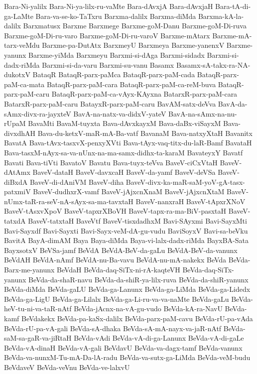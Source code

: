 {Bara-Ni-yalilx
Bara-Ni-ya-lilx-ru-vaMte
Bara-dAvxjA
Bara-dAvxjaH
Bara-tA-di-ga-LaMte
Bara-va-se-ko-TaTxru
Barxma-dalilx
Barxma-diMda
Barxma-kA-la-dalilx
Barxmatusx
Barxme
Barxmege
Barxme-goM-Danu
Barxme-goM-Di-ruva
Barxme-goM-Di-ru-varo
Barxme-goM-Di-ru-varoV
Barxme-mAtarx
Barxme-mA-tarx-veMdu
Barxme-pa-DutAtx
BarxmeyU
Barxmeya
Barxme-yanenxV
Barxme-yanunx
Barxme-yiMda
Barxmeyu
Barxmi-si-dAga
Barxmi-sidadx
Barxmi-si-dadx-riMda
Barxmi-si-da-varu
Barxmi-su-vanu
Basamx
Basamx-sA-takx-ra-NA-dukotxV
BataqR
BataqR-parx-paMca
BataqR-parx-paM-cada
BataqR-parx-paM-ca-mata
BataqR-parx-paM-cara
BataqR-parx-paM-ca-reM-buva
BataqR-parx-paM-caru
BataqR-parx-paM-ca-vAyx-KAyxna
BatarxR-parx-paM-cara
BatarxR-parx-paM-caru
BatayxR-parx-paM-caru
BavAM-satx-deVva
BavA-da-sAmx-divx-ra-jayxteV
BavA-na-natx-va-didxV-yateV
BavA-na-sAmx-na-nu-rUpaM
BavaMti
BavaM-tuyxta
Bava-dAvxkayxM
Bava-daBx-viSayxM
Bava-divxdhAH
Bava-du-ketxV-maR-mA-Ba-vatf
BavanaM
Bava-natxyXtaH
Bavanitx
BavatA
Bava-tAvx-tasxvX-penxyXVti
Bava-tAyx-vaq-titx-du-laR-Bamf
BavataH
Bava-tasxM-nAyx-sa-va-nUnx-na-ma-samx-didhx-ta-karaM
BavateyxY
Bavatf
Bavati
Bava-tiVti
BavatoV
Bavatu
Bava-tuyx-teVva
BaveV-ciCxVtaH
BaveV-dAtAmx
BaveV-dataH
BaveV-davxcaH
BaveV-da-yamf
BaveV-deVSa
BaveV-diBxdA
BaveV-di-dAniVM
BaveV-diha
BaveV-divx-ka-maR-saM-yoV-gA-tasx-patxmiV
BaveV-dudhxrX-vamf
BaveV-jAjxcnXnaM
BaveV-jAjxcnXtaM
BaveV-nUmx-taR-ra-seV-nA-sAyx-sa-ma-tavxtaH
BaveV-nanxraH
BaveV-tApxrXNoV
BaveV-tAsxvXpoV
BaveV-tapxrXBoVH
BaveV-tapx-ra-ma-BiV-pasxtaH
BaveV-tatxdA
BaveV-tatxtaH
BaveVtf
BaveV-tisxdadhxM
Bavi-SAyxmi
Bavi-SayxMti
Bavi-Sayxdf
Bavi-Sayxti
Bavi-Sayx-veM-dA-gu-vudu
BaviSoyxV
Bavi-sa-beVku
BavitA
BayA-dimAM
Baya
Baya-diMda
Baya-vi-lalx-dadx-riMda
BayxBA-Sata
BayxsotxV
BeVSa-jamf
BeVdA
BeVdA-BeV-da-gaLu
BeVdA-BeV-da-vanunx
BeVdAH
BeVdA-nAmf
BeVdA-nu-Ba-vavu
BeVdA-nu-mA-nakekx
BeVda
BeVda-Barx-me-yanunx
BeVdaH
BeVda-daq-SiTx-ni-rA-kaqteVH
BeVda-daq-SiTx-yanunx
BeVda-da-shaR-navu
BeVda-da-shiR-ya-lilx-ruva
BeVda-da-shiR-yanunx
BeVda-diMda
BeVda-gaLU
BeVda-ga-Lanunx
BeVda-ga-LiMda
BeVda-ga-Lidedx
BeVda-ga-LigU
BeVda-ga-Lilalx
BeVda-ga-Li-ru-va-va-naMte
BeVda-gaLu
BeVda-heV-tu-ni-va-taR-nAtf
BeVda-jAcnx-na-vA-gu-vudo
BeVda-kA-ra-NavU
BeVda-kamf
BeVdakekx
BeVda-pa-kaSx-dalilx
BeVda-parx-paM-cavu
BeVda-rU-pa-vAda
BeVda-rU-pa-vA-gali
BeVda-sA-dhaka
BeVda-sA-mA-nayx-va-jaR-nAtf
BeVda-saM-sa-gaR-va-jiRtaH
BeVda-vAdi
BeVda-vA-di-ga-Lanunx
BeVda-vA-di-gaLe
BeVda-vA-dinaH
BeVda-vA-gali
BeVdavU
BeVda-va-dagx-tamf
BeVda-vanunx
BeVda-va-nunxM-Tu-mA-Da-lA-radu
BeVda-va-sutx-ga-LiMda
BeVda-veM-budu
BeVdaveV
BeVda-veVnu
BeVda-ve-lalxvU
}
